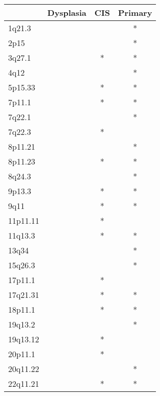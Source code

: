 \begin{tabular}{lccc}
\toprule
{} & Dysplasia & CIS & Primary \\
\midrule
1q21.3   &           &     &       * \\
2p15     &           &     &       * \\
3q27.1   &           &   * &       * \\
4q12     &           &     &       * \\
5p15.33  &           &   * &       * \\
7p11.1   &           &   * &       * \\
7q22.1   &           &     &       * \\
7q22.3   &           &   * &         \\
8p11.21  &           &     &       * \\
8p11.23  &           &   * &       * \\
8q24.3   &           &     &       * \\
9p13.3   &           &   * &       * \\
9q11     &           &   * &       * \\
11p11.11 &           &   * &         \\
11q13.3  &           &   * &       * \\
13q34    &           &     &       * \\
15q26.3  &           &     &       * \\
17p11.1  &           &   * &         \\
17q21.31 &           &   * &       * \\
18p11.1  &           &   * &       * \\
19q13.2  &           &     &       * \\
19q13.12 &           &   * &         \\
20p11.1  &           &   * &         \\
20q11.22 &           &     &       * \\
22q11.21 &           &   * &       * \\
\bottomrule
\end{tabular}
